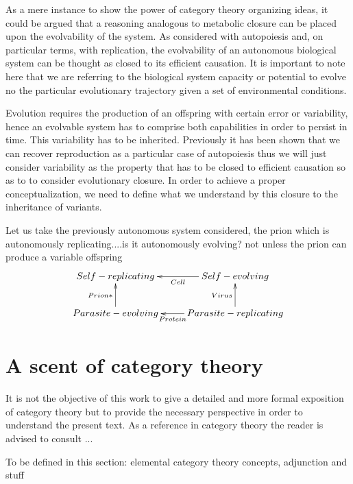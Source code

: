 \documentclass[aps,twocolumn]{revtex4-1}
\begin{document}
As a mere instance to show the power of category theory organizing ideas, it could be argued that a reasoning analogous to metabolic closure can be placed upon the evolvability of the system. As considered with autopoiesis and, on particular terms, with replication, the evolvability of an autonomous biological system can be thought as closed to its efficient causation. It is important to note here that we are referring to the biological system capacity or potential to evolve no the particular evolutionary trajectory given a set of environmental conditions. 

Evolution requires the production of an offspring with certain error or variability, hence an evolvable system has to comprise both capabilities in order to persist in time.  This variability has to be inherited. Previously it has been shown that we can recover reproduction as a particular case of autopoiesis thus we will just consider variability as the property that has to be closed to efficient causation so as to to consider evolutionary closure. In order to achieve a proper conceptualization, we need to define what we understand by this closure to the inheritance of variants. 


Let us take the previously autonomous system considered, the prion which is autonomously replicating....is it autonomously evolving? not unless the prion can produce a variable offspring
\begin{displaymath}
\xymatrix{
Self-replicating & Self-evolving \ar[l]^-{Cell}\\
Parasite-evolving \ar[u]^-{Prion*} & Parasite-replicating \ar[l]^-{Protein}\ar[u]^-{Virus}
}
\end{displaymath}
			  
\section{A scent of category theory}

It is not the objective of this work to give a detailed and more formal exposition of category theory but to provide the necessary perspective in order to understand the present text. As a reference in category theory the reader is advised to consult ...

To be defined in this section: elemental category theory concepts, adjunction and stuff
\end{document}
